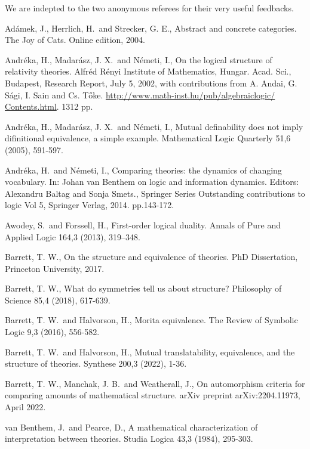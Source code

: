 \documentclass[12pt,leqno]{article}
\begin{document}
 We are indepted to the two anonymous referees for their very useful feedbacks.




\begin{thebibliography}{}
	
 Ad\'amek, J., Herrlich, H.\ and Strecker, G. E., Abstract and concrete
categories. The Joy of Cats. Online edition, 2004.

 Andr\'eka, H., Madar\'asz, J. X.\ and N\'emeti, I., On the logical
structure of relativity theories. Alfr\'ed R\'enyi Institute of
Mathematics, Hungar. Acad. Sci., Budapest, Research Report, July 5,
2002, with contributions from A. Andai, G. S\'agi, I. Sain and Cs.
T\H oke. \url{http://www.math-inst.hu/pub/algebraiclogic/
Contents.html}. 1312 pp.

 Andr\'eka, H., Madar\'asz, J. X.\ and N\'emeti, I.,
Mutual definability does not imply difinitional equivalence, a simple example.
Mathematical Logic Quarterly 51,6 (2005), 591-597.

 Andr\'eka, H.\ and N\'emeti, I., Comparing theories: the dynamics of changing vocabulary.
In: Johan van Benthem on logic and information dynamics. 
Editors: Alexandru Baltag and Sonja Smets., Springer Series Outstanding 
contributions to logic Vol 5, Springer Verlag, 2014. pp.143-172.

 Awodey, S.\ and Forssell, H., First-order logical duality. 
Annals of Pure and Applied Logic 164,3 (2013), 319--348.

 Barrett, T. W., On the structure and equivalence of theories. PhD
Dissertation, Princeton University, 2017.

 Barrett, T. W., What do symmetries tell us about
structure? Philosophy of Science 85,4 (2018), 617-639.

 Barrett, T. W.\ and Halvorson, H., Morita equivalence.
The Review of Symbolic Logic 9,3 (2016), 556-582.

 Barrett, T. W.\ and Halvorson, H., Mutual translatability, equivalence, 
and the structure of theories. Synthese 200,3 (2022), 1-36.

 Barrett, T. W., Manchak, J. B.\ and Weatherall, J., On automorphism criteria for 
comparing amounts of mathematical structure. arXiv preprint arXiv:2204.11973,  April 2022.

 van Benthem, J.\ and Pearce, D., A mathematical
characterization of interpretation between theories. Studia Logica
43,3 (1984), 295-303.


\end{thebibliography}
\end{document}
